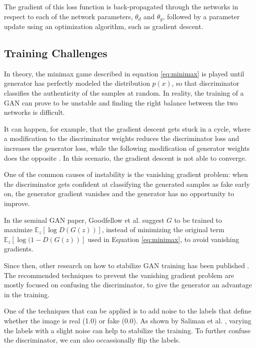 \documentclass[12pt]{report}
\begin{document}
The gradient of this loss function is back-propagated through the networks in respect to each of the network parameters, $\theta_{d}$ and $\theta_{g}$, followed by a parameter update using an optimization algorithm, such as gradient descent.

\subsection{Training Challenges} \label{sec:gan_diff}

In theory, the minimax game described in equation \ref{eq:minimax} is played until generator has perfectly modeled the distribution $p(x)$, so that discriminator classifies the authenticity of the samples at random. In reality, the training of a GAN can prove to be unstable and finding the right balance between the two networks is difficult.

It can happen, for example, that the gradient descent gets stuck in a cycle, where a modification to the discriminator weights reduces the discriminator loss and increases the generator loss, while the following modification of generator weights does the opposite \cite{salimans_improved_2016}. In this scenario, the gradient descent is not able to converge.

One of the common causes of instability is the vanishing gradient problem: when the discriminator gets confident at classifying the generated samples as fake early on, the generator gradient vanishes and the generator has no opportunity to improve. 

In the seminal GAN paper, Goodfellow et al. \cite{goodfellow_generative_2014} suggest $G$ to be trained to maximize $\mathbb{E}_{z}[\log D(G(z))]$, instead of minimizing the original term $\mathbb{E}_{z}[\log (1 - D(G(z))]$ used in Equation \ref{eq:minimax}, to avoid vanishing gradients. 

Since then, other research on how to stabilize GAN training has been published \cite{arjovsky_towards_2017}\cite{roth_stabilizing_2017}\cite{salimans_improved_2016}. The recommended techniques to prevent the vanishing gradient problem are mostly focused on confusing the discriminator, to give the generator an advantage in the training. 

One of the techniques that can be applied is to add noise to the labels that define whether the image is real (1.0) or fake (0.0). As shown by Saliman et al. \cite{salimans_improved_2016}, varying the labels with a slight noise can help to stabilize the training. To further confuse the discriminator, we can also occassionally flip the labels. 
\end{document}
